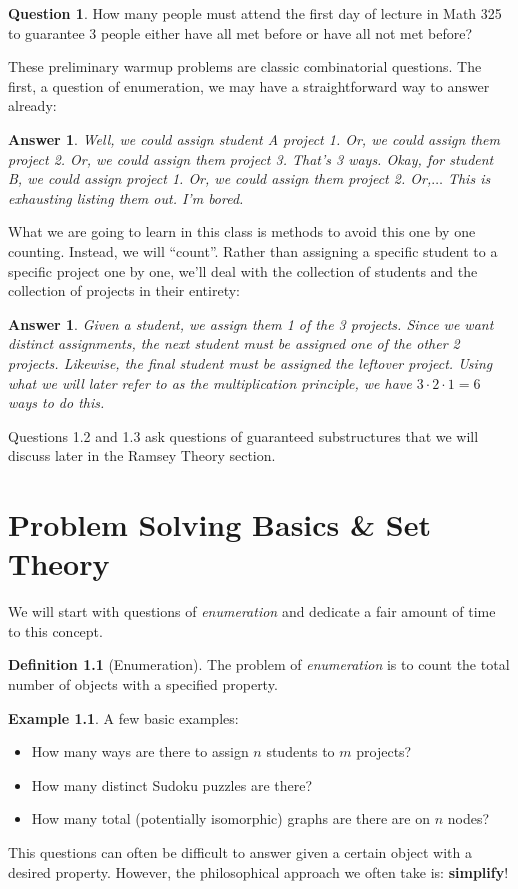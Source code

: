 \documentclass[openany]{book}
\newtheorem{answer}[thm]{Answer}
\theoremstyle{definition}
\newtheorem{definition}[thm]{Definition}
\newtheorem{question}[thm]{Question}
\newtheorem{example}[thm]{Example}
\begin{document}
\begin{question}\hfill

    How many people must attend the first day of lecture in Math 325 to guarantee 3 people either have all met before or have all not met before?
\end{question}
These preliminary warmup problems are classic combinatorial questions. The first, a question of enumeration, we may have a straightforward way to answer already:
\begin{answer}\hfill

    Well, we could assign student A project 1. Or, we could assign them project 2. Or, we could assign them project 3. That's 3 ways. Okay, for student B, we could assign project 1. Or, we could assign them project 2. Or,$\dots$ This is exhausting listing them out. I'm bored.
\end{answer}
What we are going to learn in this class is methods to avoid this one by one counting. Instead, we will ``count''. Rather than assigning a specific student to a specific project one by one, we'll deal with the collection of students and the collection of projects in their entirety:
\begin{answer}\hfill

    Given a student, we assign them 1 of the 3 projects. Since we want distinct assignments, the next student must be assigned one of the other 2 projects. Likewise, the final student must be assigned the leftover project. Using what we will later refer to as the \emph{multiplication principle}, we have $3\cdot 2\cdot 1=6$ ways to do this.
\end{answer}
Questions 1.2 and 1.3 ask questions of guaranteed substructures that we will discuss later in the Ramsey Theory section.

\chapter{Problem Solving Basics \& Set Theory}
We will start with questions of \emph{enumeration} and dedicate a fair amount of time to this concept.

\begin{definition}[Enumeration]\hfill

    The problem of \emph{enumeration} is to count the total number of objects with a specified property.
\end{definition}
\begin{example}\hfill

    A few basic examples:
    \begin{itemize}
        \item How many ways are there to assign $n$ students to $m$ projects?
        \item How many distinct Sudoku puzzles are there?
        \item How many total (potentially isomorphic) graphs are there are on $n$ nodes?
    \end{itemize}
\end{example}
This questions can often be difficult to answer given a certain object with a desired property. However, the philosophical approach we often take is: \textbf{simplify}!\\
\end{document}
